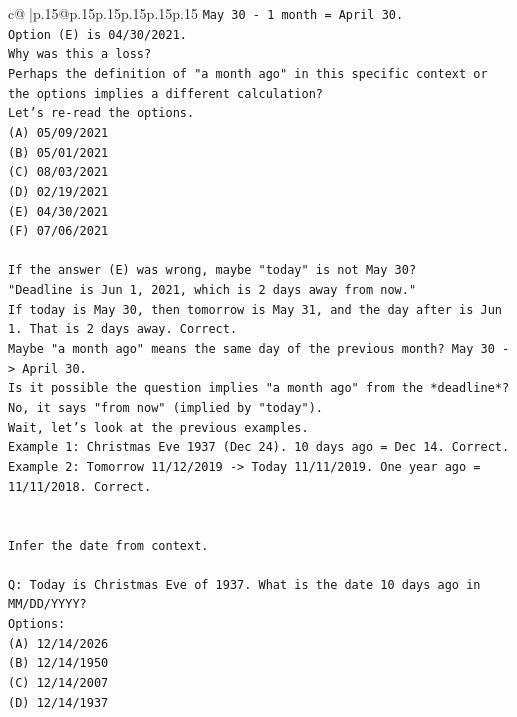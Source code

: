 \documentclass{article}
\begin{document}
{\begin{supertabular}{c@{$\;$}|p{.15\linewidth}@{}p{.15\linewidth}p{.15\linewidth}p{.15\linewidth}p{.15\linewidth}p{.15\linewidth}}
{{{\texttt{May 30 {-} 1 month = April 30.} \\
\texttt{Option (E) is 04/30/2021.} \\
\texttt{Why was this a loss?} \\
\texttt{Perhaps the definition of "a month ago" in this specific context or the options implies a different calculation?} \\
\texttt{Let's re{-}read the options.} \\
\texttt{(A) 05/09/2021} \\
\texttt{(B) 05/01/2021} \\
\texttt{(C) 08/03/2021} \\
\texttt{(D) 02/19/2021} \\
\texttt{(E) 04/30/2021} \\
\texttt{(F) 07/06/2021} \\
\\ 
\texttt{If the answer (E) was wrong, maybe "today" is not May 30?} \\
\texttt{"Deadline is Jun 1, 2021, which is 2 days away from now."} \\
\texttt{If today is May 30, then tomorrow is May 31, and the day after is Jun 1. That is 2 days away. Correct.} \\
\texttt{Maybe "a month ago" means the same day of the previous month? May 30 {-}> April 30.} \\
\texttt{Is it possible the question implies "a month ago" from the *deadline*? No, it says "from now" (implied by "today").} \\
\texttt{Wait, let's look at the previous examples.} \\
\texttt{Example 1: Christmas Eve 1937 (Dec 24). 10 days ago = Dec 14. Correct.} \\
\texttt{Example 2: Tomorrow 11/12/2019 {-}> Today 11/11/2019. One year ago = 11/11/2018. Correct.} \\
\\ 
\\ 
\texttt{Infer the date from context.} \\
\\ 
\texttt{Q: Today is Christmas Eve of 1937. What is the date 10 days ago in MM/DD/YYYY?} \\
\texttt{Options:} \\
\texttt{(A) 12/14/2026} \\
\texttt{(B) 12/14/1950} \\
\texttt{(C) 12/14/2007} \\
\texttt{(D) 12/14/1937} \\
}}}
\end{supertabular}}
\end{document}
